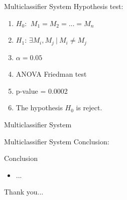 \documentclass{beamer}
\begin{document}
\begin{frame}{Multiclassifier System}
Hypothesis test:
\begin{enumerate}
\item $H_0$: $\ M_1 = M_2 = ... =M_n$
\item $H_1$: $\exists M_i,M_j \ | \ M_i\neq M_j$
\item $\alpha = 0.05$
\item ANOVA Friedman test
\item p-value = 0.0002
\item The hypothesis $H_0$ is reject.
\end{enumerate}
\end{frame}


\begin{frame}{Multiclassifier System}
\begin{table}[!h]
\renewcommand{\arraystretch}{1.3}
\caption{Teste de Comparação Múltiple de Nemenyi }
\label{tab:test_nemeyi}
\centering
{}
\end{table}
\end{frame}

\begin{frame}{Multiclassifier System}
Conclusion:


\end{frame}



\begin{frame}{Conclusion}
\begin{itemize}
\item ...
\end{itemize}
\end{frame}

\begin{frame}{}
Thank you...
\end{frame}
\end{document}
